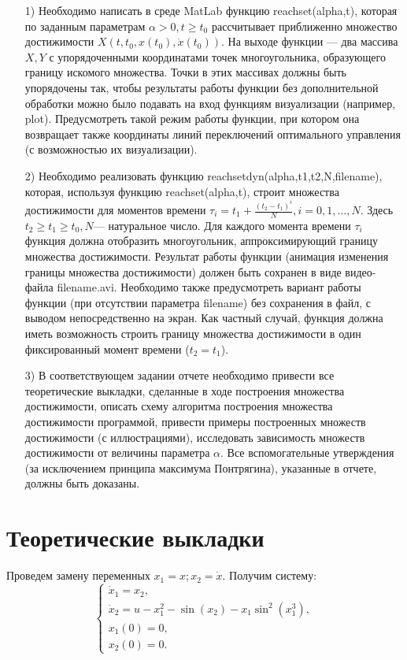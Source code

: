 \documentclass{article}
\theoremstyle{definition}
\begin{document}
	\begin{itemize}
		\item [1)]{Необходимо написать в среде MatLab функцию reachset(alpha,t), которая по заданным параметрам $\alpha > 0, t \geq t_0$ рассчитывает приближенно множество достижимости $X(t,t_0,x(t_0), \dot x(t_0)).$ На выходе функции --- два массива $X,Y$ с упорядоченными координатами точек многоугольника, образующего границу искомого множества. Точки в этих массивах должны быть упорядочены так, чтобы результаты работы функции без дополнительной обработки можно было подавать на вход функциям визуализации (например, plot). Предусмотреть такой режим работы функции, при котором она возвращает также координаты линий переключений оптимального управления (с возможностью их визуализации).}
		\item [2)]{Необходимо реализовать функцию reachsetdyn(alpha,t1,t2,N,filename), которая, используя функцию reachset(alpha,t), строит множества достижимости для моментов времени $\tau_i = t_1 + \frac{(t_2 - t_1)^i}{N}, i = 0,1,\ldots, N$. Здесь $t_2 \geq t_1 \geq t_0, N$--- натуральное число. Для каждого момента времени $\tau_i$ функция должна отобразить многоугольник, аппроксимирующий границу множества достижимости. Результат работы функции (анимация изменения границы множества достижимости) должен быть сохранен в виде видео-файла filename.avi. Необходимо также предусмотреть вариант работы функции (при отсутствии параметра filename) без сохранения в файл, с выводом непосредственно на экран. Как частный случай, функция должна иметь возможность строить границу множества достижимости в один фиксированный момент времени ($t_2 = t_1$).}
		\item [3)]{В соответствующем задании отчете необходимо привести все теоретические выкладки, сделанные в ходе построения множества достижимости, описать схему алгоритма построения множества достижимости программой, привести примеры построенных множеств достижимости (с иллюстрациями), исследовать зависимость множеств достижимости от величины параметра $\alpha$. Все вспомогательные утверждения (за исключением принципа максимума Понтрягина), указанные в отчете, должны быть доказаны.}
	\end{itemize}
	
	\newpage
	{\vspace*{-2cm} \hspace*{-1cm}\section{Теоретические выкладки}}
	{Проведем замену переменных $x_1 = x;  x_2 = \dot x.$ Получим систему:}
	\begin{equation}
		\begin{cases}
		\dot x_1 = x_2,\\
		\dot x_2 = u - x_1^2 - \sin(x_2) - x_1\sin^2(x_1^3),\\
		x_1(0) = 0,\\
		x_2(0) = 0.
		\end{cases}
	\end{equation}
	
\end{document}
